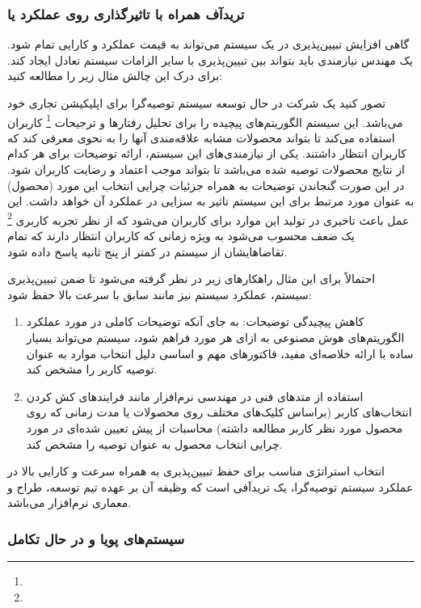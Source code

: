\subsubsection{تریدآف همراه با تاثیرگذاری روی عملکرد یا }

گاهی افزایش تبیین‌پذیری در یک سیستم می‌تواند به قیمت عملکرد و کارایی تمام شود.
یک مهندس نیازمندی باید بتواند بین تبیین‌پذیری با سایر الزامات سیستم  تعادل  ایجاد کند. برای درک این چالش مثال زیر را مطالعه کنید:

تصور کنید یک شرکت در حال توسعه سیستم توصیه‌گرا برای اپلیکیشن تجاری خود می‌باشد.
این سیستم الگوریتم‌های پیچیده  را برای تحلیل رفتار‌ها و ترجیحات
\footnote{} کاربران استفاده می‌کند تا بتواند محصولات مشابه
علاقه‌مندی آنها را به نحوی معرفی کند که کاربران انتظار داشتند. یکی از
نیازمندی‌های  این سیستم، ارائه توضیحات برای هر کدام از نتایج محصولات
توصیه شده می‌باشد تا بتواند موجب اعتماد و رضایت کاربران شود. در این صورت گنجاندن
توضیحات به همراه جزئیات چرایی انتخاب این مورد (محصول) به عنوان مورد مرتبط برای
این سیستم تاثیر به سزایی در عملکرد آن خواهد داشت. این عمل باعث تاخیری در تولید
این موارد برای کاربران می‌شود که از نظر تجربه کاربری \footnote{} یک ضعف محسوب می‌شود به ویژه زمانی که کاربران انتظار دارند که تمام
تقاضا‌هایشان از سیستم در کمتر از پنج ثانیه پاسخ داده شود.

احتمالاً برای این مثال راهکار‌های زیر در نظر گرفته می‌شود تا ضمن تبیین‌پذیری
سیستم، عملکرد سیستم نیز مانند سابق با سرعت بالا حفظ شود:

\begin{enumerate}
    \item کاهش پیچیدگی توضیحات: به جای آنکه توضیحات کاملی در مورد عملکرد
    الگوریتم‌های هوش مصنوعی به ازای هر مورد فراهم شود، سیستم می‌تواند بسیار ساده
    با ارائه خلاصه‌ای مفید، فاکتور‌های مهم و اساسی دلیل انتخاب موارد به عنوان
    توصیه کاربر را مشخص کند.
    \item استفاده از متد‌های فنی در مهندسی نرم‌افزار مانند فرایند‌های کش کردن
    انتخاب‌های کاربر (براساس کلیک‌های مختلف روی محصولات یا مدت زمانی که روی
    محصول مورد نظر کاربر مطالعه داشته) محاسبات از پیش تعیین شده‌ای در مورد چرایی
    انتخاب محصول به عنوان توصیه را مشخص کند.
\end{enumerate}

انتخاب استراتژی مناسب برای حفظ تبیین‌پذیری به همراه سرعت و کارایی بالا در عملکرد
سیستم توصیه‌گرا، یک تریدآفی است که وظیفه آن بر عهده تیم توسعه، طراح و معماری
نرم‌افزار می‌باشد.

\subsubsection{سیستم‌های پویا و در حال تکامل}

